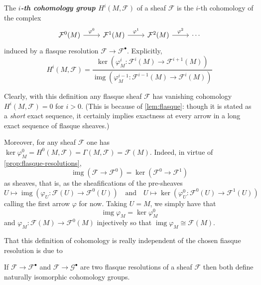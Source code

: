 \documentclass{article}
\newcommand{\Fc}{\mathcal{F}}
\newcommand{\Gc}{\mathcal{G}}
\DeclareMathOperator{\img}{img}
\begin{document}
\begin{defn}
	The \textbf{\textit{$i$-th cohomology group $H^i(M,\Fc)$}} of a sheaf $\Fc$ is the $i$-th cohomology of the complex
	\[\begin{tikzcd}
		\Fc^0(M)\arrow[r,"\varphi^0"]&\Fc^1(M)\arrow[r,"\varphi^1"]&\Fc^2(M)\arrow[r,"\varphi^2"]&\cdots
	\end{tikzcd}\]
	{\color{cyan}induced by a flasque resolution} $\Fc\to\Fc^\bullet$. Explicitly,
	\[H^i(M,\Fc)=\dfrac{\ker(\varphi^i_M:\Fc^i(M)\to\Fc^{i+1}(M))}{\img(\varphi^{i-1}_M:\Fc^{i-1}(M)\to\Fc^i(M))}\]
\end{defn}
Clearly, with this definition any flasque sheaf $\Fc$ has vanishing cohomology $H^i(M,\Fc)=0$ for $i>0$. (This is because of \cref{lem:flasque}: though it is stated as a \textit{short} exact sequence, it certainly implies exactness at every arrow in a long exact sequence of flasque sheaves.)

Moreover, for any sheaf $\Fc$ one has $\ker\varphi_M^0=H^0(M,\Fc)=\Gamma(M,\Fc)=\Fc(M)$. Indeed, in virtue of \cref{prop:flasque-resolutions}, \[\img(\Fc\to\Fc^0)=\ker(\Fc^0\to\Fc^1)\]
as sheaves, that is, as the sheafifications of the pre-sheaves
\[U\mapsto\img (\varphi_U:\Fc(U)\to\Fc^0(U))\quad \text{and}\quad U\mapsto\ker(\varphi^0_U:\Fc^0(U)\to\Fc^1(U))\]
calling the first arrow $\varphi$ for now. Taking $U=M$, we simply have that
\[\img\varphi_M=\ker\varphi^0_M\]
and $\varphi_M:\Fc(M)\to\Fc^0(M)$ injectively so that $\img\varphi_M\cong\Fc(M)$.

That this definition of cohomology is really independent of the chosen fiasque resolution is due to
\begin{prop}
	If $\Fc\to\Fc^\bullet$ and $\Fc\to\Gc^\bullet$ are two flasque resolutions of a sheaf $\Fc$ then both define naturally isomorphic cohomology groups.
\end{prop}
\end{document}
